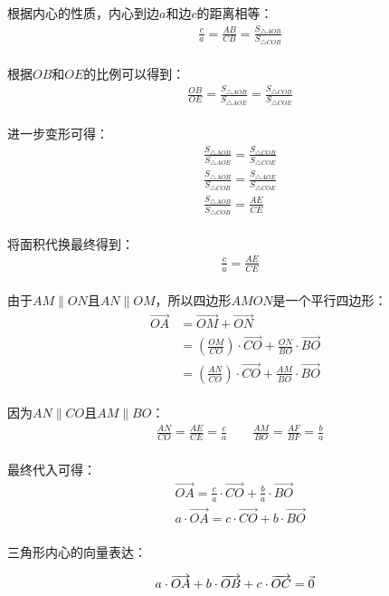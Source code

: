\documentclass[UTF8]{ctexart}
\let\nvec\vec
\def\vec#1{\nvec{\vphantom b\smash{#1}}}
\begin{document}
    根据内心的性质，内心到边$a$和边$c$的距离相等：\vspace{3pt}
    \begin{align}
        &\frac{c}{a}=\frac{AB}{CB}=\frac{S_{\triangle AOB}}{S_{\triangle COB}}
    \end{align}\\
    根据$OB$和$OE$的比例可以得到：
    \begin{align}
        &\frac{OB}{OE}=\frac{S_{\triangle AOB}}{S_{\triangle AOE}}=\frac{S_{\triangle COB}}{S_{\triangle COE}}
    \end{align}\\
    进一步变形可得：
    \begin{align}
        &\frac{S_{\triangle AOB}}{S_{\triangle AOE}}=\frac{S_{\triangle COB}}{S_{\triangle COE}}\\[3mm]
        &\frac{S_{\triangle AOB}}{S_{\triangle COB}}=\frac{S_{\triangle AOE}}{S_{\triangle COE}}\\[3mm]
        &\frac{S_{\triangle AOB}}{S_{\triangle COB}}=\frac{AE}{CE}
    \end{align}\\
    将面积代换最终得到：
    \begin{align}
        &\frac{c}{a}=\frac{AE}{CE}
    \end{align}\\
    由于$AM\parallel ON$且$AN\parallel OM$，所以四边形$AMON$是一个平行四边形：
    \begin{align}
        \overrightarrow{OA}
        &=\overrightarrow{OM}+\overrightarrow{ON}\\[3mm]
        &=\left(\frac{OM}{CO}\right)\cdot\overrightarrow{CO}+\frac{ON}{BO}\cdot\overrightarrow{BO}\\[3mm]
        &=\left(\frac{AN}{CO}\right)\cdot\overrightarrow{CO}+\frac{AM}{BO}\cdot\overrightarrow{BO}
    \end{align}\\
    因为$AN\parallel CO$且$AM\parallel BO$：
    \begin{align}
        &\frac{AN}{CO}=\frac{AE}{CE}=\frac{c}{a}\qquad\frac{AM}{BO}=\frac{AF}{BF}=\frac{b}{a}
    \end{align}\\
    最终代入可得：
    \begin{align}
        &\overrightarrow{OA}=\frac{c}{a}\cdot\overrightarrow{CO}+\frac{b}{a}\cdot\overrightarrow{BO}\\[3mm]
        &a\cdot\overrightarrow{OA}=c\cdot\overrightarrow{CO}+b\cdot\overrightarrow{BO}
    \end{align}\\
    三角形内心的向量表达：
    \begin{large}
        \begin{equation*}
            a\cdot\overrightarrow{OA}+b\cdot\overrightarrow{OB}+c\cdot\overrightarrow{OC}=\vec{0}
        \end{equation*}
    \end{large}
\end{document}
